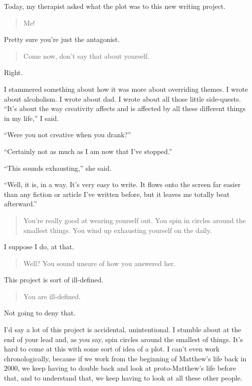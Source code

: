 Today, my therapist asked what the plot was to this new writing project.

\begin{quote}
Me!
\end{quote}

Pretty sure you're just the antagonist.

\begin{quote}
Come now, don't say that about yourself.
\end{quote}

Right.

I stammered something about how it was more about overriding themes. I wrote about alcoholism. I wrote about dad. I wrote about all those little side-quests. ``It's about the way creativity affects and is affected by all these different things in my life,'' I said.

``Were you not creative when you drank?''

``Certainly not as much as I am now that I've stopped.''

``This sounds exhausting,'' she said.

``Well, it is, in a way. It's very easy to write. It flows onto the screen far easier than any fiction or article I've written before, but it leaves me totally beat afterward.''

\begin{quote}
You're really good at wearing yourself out. You spin in circles around the smallest things. You wind up exhausting yourself on the daily.
\end{quote}

I suppose I do, at that.

\begin{quote}
Well? You sound unsure of how you answered her.
\end{quote}

This project is sort of ill-defined.

\begin{quote}
You are ill-defined.
\end{quote}

Not going to deny that.

I'd say a lot of this project is accidental, unintentional. I stumble about at the end of your lead and, as you say, spin circles around the smallest of things. It's hard to come at this with some sort of idea of a plot. I can't even work chronologically, because if we work from the beginning of Matthew's life back in 2000, we keep having to double back and look at proto-Matthew's life before that, and to understand that, we keep having to look at all these other people.

